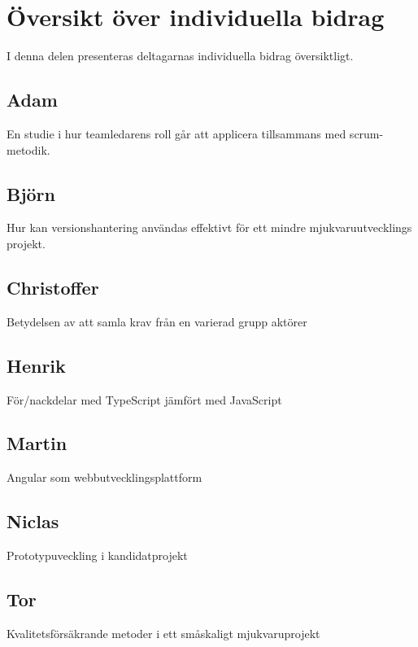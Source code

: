 \section{Översikt över individuella bidrag}
I denna delen presenteras deltagarnas individuella bidrag översiktligt.

\subsection{Adam}
En studie i hur teamledarens roll går att applicera tillsammans med scrum-metodik.
\subsection{Björn}
Hur kan versionshantering användas effektivt för ett mindre mjukvaruutvecklings projekt.
\subsection{Christoffer}
Betydelsen av att samla krav från en varierad grupp aktörer
\subsection{Henrik}
För/nackdelar med TypeScript jämfört med JavaScript
\subsection{Martin}
Angular som webbutvecklingsplattform
\subsection{Niclas}
Prototypuveckling i kandidatprojekt
\subsection{Tor}
Kvalitetsförsäkrande metoder i ett småskaligt mjukvaruprojekt
